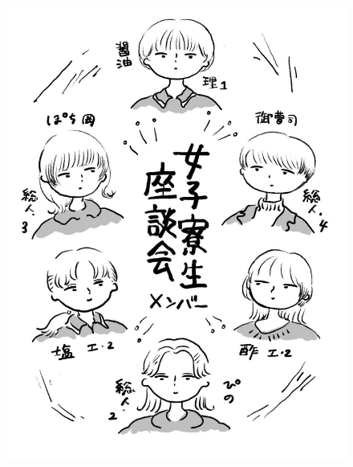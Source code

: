 \begin{figure}[H]
  \centering
  \includegraphics[width=18cm]{gazo/josiryose_member.jpg}
\end{figure}

\newpage




